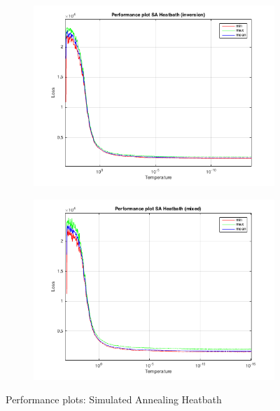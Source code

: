 \documentclass{paper}
\begin{document}
\begin{figure}[!h]
{\begin{subfigure}[]{0.7\linewidth}
        		\includegraphics[width=\linewidth]{SAHeatbath(inversion)_performance}
    	\end{subfigure}%
    	\begin{subfigure}[]{0.7\linewidth}
		\centering
        		\includegraphics[width=\linewidth]{SAHeatbath(mixed)_performance}
    	\end{subfigure}
    }
    \caption{Performance plots: Simulated Annealing Heatbath}    
\label{fig:HBPerf}
\end{figure}
\end{document}
